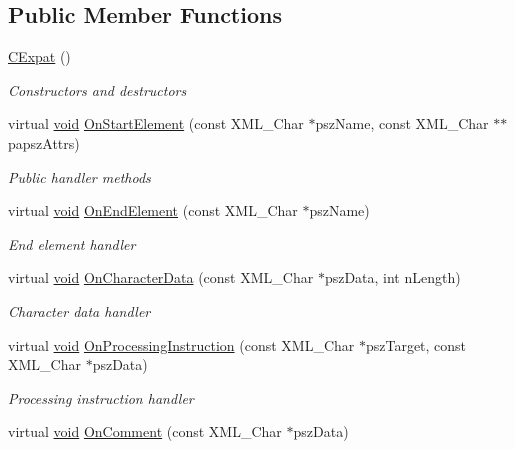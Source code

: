 \subsection*{\-Public \-Member \-Functions}
\begin{DoxyCompactItemize}
\item 
\hyperlink{class_c_expat_a1aa7f71152f1863f2f0b6d8e1df64513}{\-C\-Expat} ()
\begin{DoxyCompactList}\small\item\em \-Constructors and destructors \end{DoxyCompactList}\item 
virtual \hyperlink{_cpclient_8h_a6464f7480a0fd0ee170cba12b2c0497f}{void} \hyperlink{class_c_expat_a60bd97eaa686c3a64d23dd07f3831db3}{\-On\-Start\-Element} (const \-X\-M\-L\-\_\-\-Char $\ast$psz\-Name, const \-X\-M\-L\-\_\-\-Char $\ast$$\ast$papsz\-Attrs)
\begin{DoxyCompactList}\small\item\em \-Public handler methods \end{DoxyCompactList}\item 
virtual \hyperlink{_cpclient_8h_a6464f7480a0fd0ee170cba12b2c0497f}{void} \hyperlink{class_c_expat_abff31a8eb9ea8ea0b0594ba8f497e8c4}{\-On\-End\-Element} (const \-X\-M\-L\-\_\-\-Char $\ast$psz\-Name)
\begin{DoxyCompactList}\small\item\em \-End element handler \end{DoxyCompactList}\item 
virtual \hyperlink{_cpclient_8h_a6464f7480a0fd0ee170cba12b2c0497f}{void} \hyperlink{class_c_expat_a4ee7b948e42f1c1a035fe386075d3691}{\-On\-Character\-Data} (const \-X\-M\-L\-\_\-\-Char $\ast$psz\-Data, int n\-Length)
\begin{DoxyCompactList}\small\item\em \-Character data handler \end{DoxyCompactList}\item 
virtual \hyperlink{_cpclient_8h_a6464f7480a0fd0ee170cba12b2c0497f}{void} \hyperlink{class_c_expat_a49a0c1058dd26ef680baea8af965778f}{\-On\-Processing\-Instruction} (const \-X\-M\-L\-\_\-\-Char $\ast$psz\-Target, const \-X\-M\-L\-\_\-\-Char $\ast$psz\-Data)
\begin{DoxyCompactList}\small\item\em \-Processing instruction handler \end{DoxyCompactList}\item 
virtual \hyperlink{_cpclient_8h_a6464f7480a0fd0ee170cba12b2c0497f}{void} \hyperlink{class_c_expat_a5c44bbfc76f1444880b40ddecae92007}{\-On\-Comment} (const \-X\-M\-L\-\_\-\-Char $\ast$psz\-Data)
$$
\end{DoxyCompactItemize}
